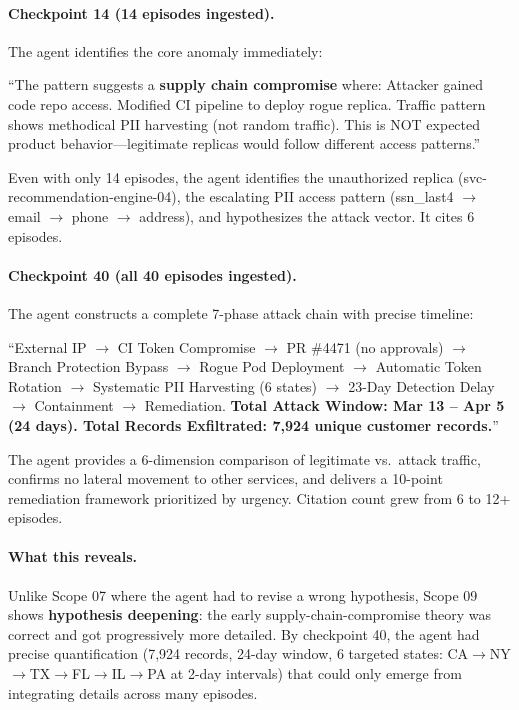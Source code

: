 \documentclass[11pt,letterpaper]{article}
\begin{document}
\paragraph{Checkpoint 14 (14 episodes ingested).}
The agent identifies the core anomaly immediately:

\begin{agentquote}
``The pattern suggests a \textbf{supply chain compromise} where: Attacker gained code repo access. Modified CI pipeline to deploy rogue replica. Traffic pattern shows methodical PII harvesting (not random traffic). This is NOT expected product behavior---legitimate replicas would follow different access patterns.''
\end{agentquote}

Even with only 14 episodes, the agent identifies the unauthorized replica (svc-recommendation-engine-04), the escalating PII access pattern (ssn\_last4 $\to$ email $\to$ phone $\to$ address), and hypothesizes the attack vector. It cites 6 episodes.

\paragraph{Checkpoint 40 (all 40 episodes ingested).}
The agent constructs a complete 7-phase attack chain with precise timeline:

\begin{agentquote}
``External IP $\to$ CI Token Compromise $\to$ PR \#4471 (no approvals) $\to$ Branch Protection Bypass $\to$ Rogue Pod Deployment $\to$ Automatic Token Rotation $\to$ Systematic PII Harvesting (6 states) $\to$ 23-Day Detection Delay $\to$ Containment $\to$ Remediation. \textbf{Total Attack Window: Mar 13 -- Apr 5 (24 days). Total Records Exfiltrated: 7,924 unique customer records.}''
\end{agentquote}

The agent provides a 6-dimension comparison of legitimate vs.\ attack traffic, confirms no lateral movement to other services, and delivers a 10-point remediation framework prioritized by urgency. Citation count grew from 6 to 12+ episodes.

\paragraph{What this reveals.} Unlike Scope 07 where the agent had to revise a wrong hypothesis, Scope 09 shows \textbf{hypothesis deepening}: the early supply-chain-compromise theory was correct and got progressively more detailed. By checkpoint 40, the agent had precise quantification (7,924 records, 24-day window, 6 targeted states: CA$\to$NY$\to$TX$\to$FL$\to$IL$\to$PA at 2-day intervals) that could only emerge from integrating details across many episodes.
\end{document}
